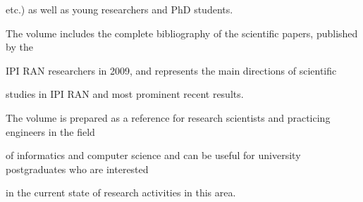      etc.) as well as young  researchers and PhD students.


     


     The volume includes the complete bibliography of the scientific papers, published by the 


IPI RAN researchers in 2009, and represents the main directions of scientific


studies in IPI RAN and most prominent recent results.





The volume is prepared as a reference for research scientists and practicing engineers in the field 


of informatics and computer science and can be useful for university postgraduates who are interested 


in the current state of research activities in this area.


